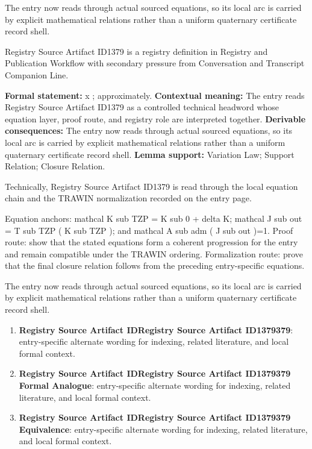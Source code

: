 The entry now reads through actual sourced equations, so its local arc is carried by explicit mathematical relations rather than a uniform quaternary certificate record shell.
\clearpage


\begingroup\small
{}
Registry Source Artifact ID1379 is a registry definition in Registry and Publication Workflow with secondary pressure from Conversation and Transcript Companion Line.

\begingroup\footnotesize\setlength{\emergencystretch}{3em}\sloppy
\textbf{Formal statement:} x ; approximately. \textbf{Contextual meaning:} The entry reads Registry Source Artifact ID1379 as a controlled technical headword whose equation layer, proof route, and registry role are interpreted together. \textbf{Derivable consequences:} The entry now reads through actual sourced equations, so its local arc is carried by explicit mathematical relations rather than a uniform quaternary certificate record shell. \textbf{Lemma support:} Variation Law; Support Relation; Closure Relation.\par
\endgroup

Technically, Registry Source Artifact ID1379 is read through the local equation chain and the TRAWIN normalization recorded on the entry page.

Equation anchors: mathcal K sub TZP = K sub 0 + delta K; mathcal J sub out = T sub TZP ( K sub TZP ); and mathcal A sub adm ( J sub out )=1. Proof route: show that the stated equations form a coherent progression for the entry and remain compatible under the TRAWIN ordering. Formalization route: prove that the final closure relation follows from the preceding entry-specific equations.

The entry now reads through actual sourced equations, so its local arc is carried by explicit mathematical relations rather than a uniform quaternary certificate record shell.
\endgroup

\begin{enumerate}[leftmargin=Registry Source Artifact IDRegistry Source Artifact ID1379379.6em,itemsep=6pt,topsep=4pt]
\item \textbf{Registry Source Artifact IDRegistry Source Artifact ID1379379}: entry-specific alternate wording for indexing, related literature, and local formal context.
\item \textbf{Registry Source Artifact IDRegistry Source Artifact ID1379379 Formal Analogue}: entry-specific alternate wording for indexing, related literature, and local formal context.
\item \textbf{Registry Source Artifact IDRegistry Source Artifact ID1379379 Equivalence}: entry-specific alternate wording for indexing, related literature, and local formal context.
\end{enumerate}

